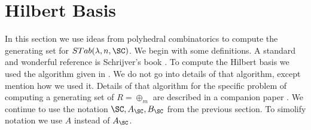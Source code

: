 
\section{Hilbert Basis}

\label{sec:hilbert}
In this section we use ideas from polyhedral combinatorics to compute the generating set for 
$STab(\lambda,n,\SC)$.  We begin with some definitions. 
A standard and wonderful reference is Schrijver's book \cite{schrijver1998theory}. 
To compute the Hilbert basis we used the algorithm given in \cite{hemmecke2002computation}. 
We do not go into details of that algorithm, except mention how we used it.
Details of that algorithm for the specific problem of computing a generating set of $R = \oplus_m$ are described in a companion paper \cite{SS21}. 
We continue to use the notation
$\SC, A_{\SC},B_{\SC}$ from the previous section. To simolify notation we use $A$ instead of $A_{\SC}$.

